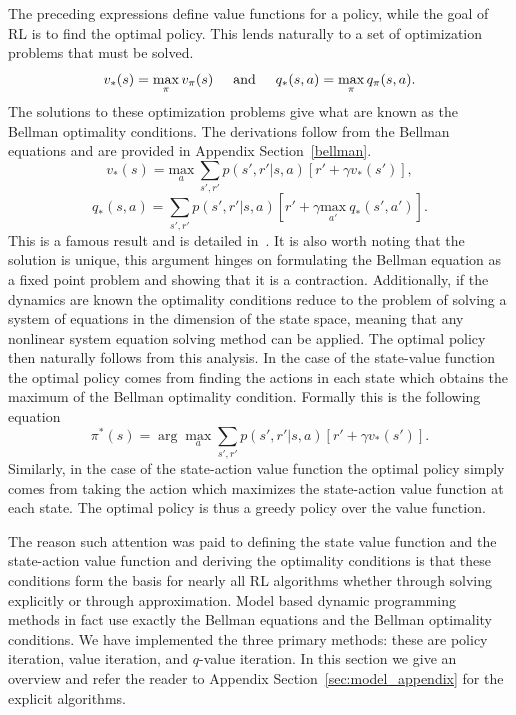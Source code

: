 \documentclass{article}
\begin{document}
The preceding expressions define value functions for a policy, while the goal of RL is to find the optimal policy. This lends naturally to a set of optimization problems that must be solved. 
\begin{equation}
v_*(s) = \max_\pi v_\pi(s) \hspace{5mm} \text{and} \hspace{5mm} q_*(s, a) = \max_\pi q_\pi(s, a).
\end{equation}
The solutions to these optimization problems give what are known as the Bellman optimality conditions. The derivations follow from the Bellman equations and are provided in Appendix Section~\ref{bellman}.
\begin{equation}\label{eq:v_opt}
v_*(s) = \underset{a}{\text{max}} \ \sum_{s', r'}p(s', r'|s,a)[r' + \gamma v_*(s')], 
\end{equation}
\begin{equation}\label{eq:q_opt}
q_*(s,a) = \sum_{s', r'}p(s', r'|s,a)[r' + \gamma \underset{a'}{\text{max}} \ q_*(s',a')].
\end{equation}
This is a famous result and is detailed in~\cite{bellman2013dynamic}. It is also worth noting that the solution is unique, this argument hinges on formulating the Bellman equation as a fixed point problem and showing that it is a contraction. Additionally, if the dynamics are known the optimality conditions reduce to the problem of solving a system of equations in the dimension of the state space, meaning that any nonlinear system equation solving method can be applied. The optimal policy then naturally follows from this analysis. In the case of the state-value function the optimal policy comes from finding the actions in each state which obtains the maximum of the Bellman optimality condition. Formally this is the following equation
\begin{equation}\label{eq:improvement}
\pi^*(s) = \arg \max_a \sum_{s', r'}p(s', r'|s,a)[r' + \gamma v_*(s')].
\end{equation}
Similarly, in the case of the state-action value function the optimal policy simply comes from taking the action which maximizes the state-action value function at each state. The optimal policy is thus a greedy policy over the value function.

The reason such attention was paid to defining the state value function and the state-action value function and deriving the optimality conditions is that these conditions form the basis for nearly all RL algorithms whether through solving explicitly or through approximation. Model based dynamic programming methods in fact use exactly the Bellman equations and the Bellman optimality conditions. We have implemented the three primary methods: these are policy iteration, value iteration, and $q$-value iteration. In this section we give an overview and refer the reader to Appendix Section~\ref{sec:model_appendix} for the explicit algorithms.
\end{document}
